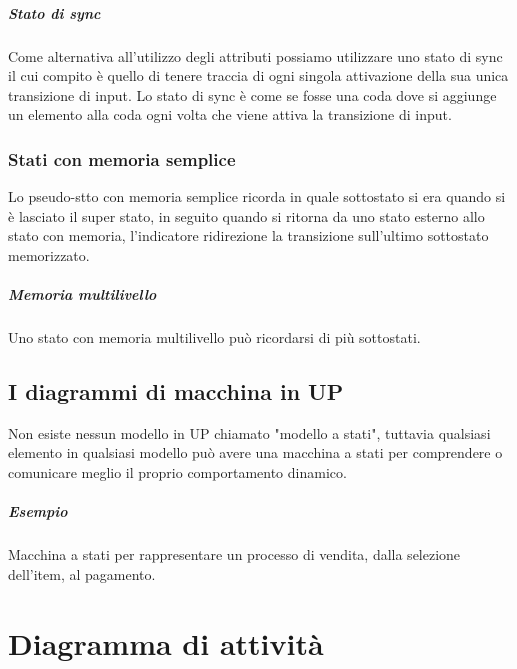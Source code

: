 \paragraph*{Stato di sync} Come alternativa all'utilizzo degli attributi possiamo utilizzare uno stato di sync
il cui compito è quello di tenere traccia di ogni singola attivazione della sua unica transizione di
input. Lo stato di sync è come se fosse una coda dove si aggiunge un elemento alla coda ogni volta
che viene attiva la transizione di input.
\subsection*{Stati con memoria semplice} 
Lo pseudo-stto con memoria semplice ricorda in quale sottostato si era quando si è lasciato il super stato,
in seguito quando si ritorna da uno stato esterno allo stato con memoria, l'indicatore ridirezione la 
transizione sull'ultimo sottostato memorizzato.
\paragraph*{Memoria multilivello} Uno stato con memoria multilivello può ricordarsi di più sottostati.
\section{I diagrammi di macchina in UP}
Non esiste nessun modello in UP chiamato "modello a stati", tuttavia qualsiasi elemento in qualsiasi modello
può avere una macchina a stati per comprendere o comunicare meglio il proprio comportamento dinamico.
\paragraph*{Esempio} Macchina a stati per rappresentare un processo di vendita, dalla selezione dell'item,
al pagamento.
\chapter{Diagramma di attività}
